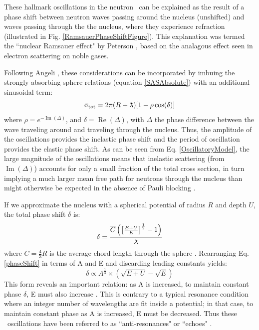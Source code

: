 These hallmark oscillations in the neutron \tot\ can be explained as the result
of a phase shift between 
neutron waves passing around the nucleus (unshifted) and waves passing
through the the nucleus, where they experience refraction
(illustrated in Fig. \ref{RamsauerPhaseShiftFigure}). This explanation was termed the ``nuclear 
Ramsauer effect" by Peterson \cite{Peterson1962}, based on the analagous effect seen in 
electron scattering on noble gases.

Following Angeli \cite{Angeli1970}, these considerations can be incorporated by
imbuing the strongly-absorbing sphere relations (equation \ref{SASAbsolute}) with an additional sinusoidal term:
\begin{equation} \label{OscillatoryModel}
    \tot = 2\pi (R+\lambdabar)[1 - \rho \cos(\delta)]
\end{equation}
where $\rho = e^{-\operatorname{Im}(\Delta)}$, and $\delta =
\operatorname{Re}(\Delta)$, with $\Delta$ the phase difference between the wave traveling
around and traveling through the nucleus. Thus, the amplitude of the oscillations provides the 
inelastic phase shift and the period of oscillation provides the elastic phase shift.
As can be seen from Eq. \ref{OscillatoryModel}, the large magnitude of the oscillations means that 
inelastic scattering (from $\operatorname{Im}(\Delta)$) accounts for only a small fraction of the 
total cross section, in turn implying a much larger mean free path for neutrons through the nucleus 
than might otherwise be expected in the absence of Pauli blocking \cite{Mohr1955}.

If we approximate the nucleus with a
spherical potential of radius $R$ and depth $U$, the total phase shift $\delta$ is:
\begin{equation} \label{phaseShift}
    \delta =
    \frac{\overline{C}\left(\left[{\frac{E+U}{E}}\right]^{\frac{1}{2}}-1\right)}{\lambdabar}
\end{equation}
where $\overline{C} = \frac{4}{3}R$ is the average chord length through the
sphere \cite{Angeli1970}. Rearranging Eq. \ref{phaseShift} in terms of A and E and
discarding leading constants yields:
\begin{equation}
    \delta \propto A^{\frac{1}{3}}\times\left(\sqrt{E+U}-\sqrt{E}\right)
\end{equation}
This form reveals an important relation: as A is increased, to maintain constant 
phase $\delta$, E must also increase \cite{Satchler1980, Peterson1962}. 
This is contrary to a typical resonance condition where an integer number of wavelengths
are fit inside a potential; in that case, to maintain constant phase as A is increased,
E must be decreased. Thus these \tot\ oscillations have been referred to as
``anti-resonances" or ``echoes" \cite{Satchler1980, McVoy1967}.


